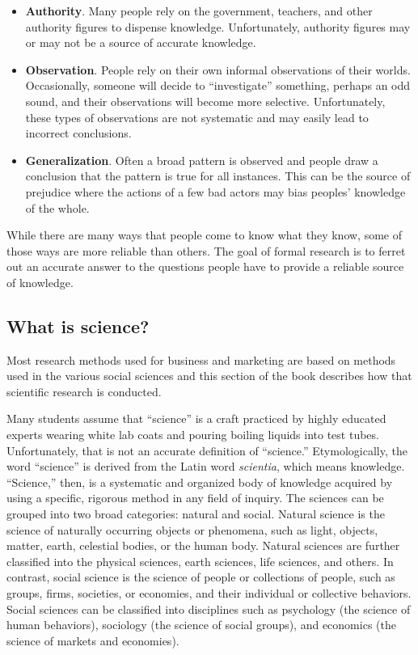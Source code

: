 \begin{itemize}
	\item \textbf{Authority}. Many people rely on the government, teachers, and other authority figures to dispense knowledge. Unfortunately, authority figures may or may not be a source of accurate knowledge.
	
	\item \textbf{Observation}. People rely on their own informal observations of their worlds. Occasionally, someone will decide to ``investigate'' something, perhaps an odd sound, and their observations will become more selective. Unfortunately, these types of observations are not systematic and may easily lead to incorrect conclusions.
	
	\item \textbf{Generalization}. Often a broad pattern is observed and people draw a conclusion that the pattern is true for all instances. This can be the source of prejudice where the actions of a few bad actors may bias peoples' knowledge of the whole.
	
\end{itemize} 

While there are many ways that people come to know what they know, some of those ways are more reliable than others. The goal of formal research is to ferret out an accurate answer to the questions people have \textemdash \; to provide a reliable source of knowledge. 

\subsection{What is science?}

Most research methods used for business and marketing are based on methods used in the various social sciences and this section of the book describes how that scientific research is conducted.

Many students assume that ``science'' is a craft practiced by highly educated experts wearing white lab coats and pouring boiling liquids into test tubes. Unfortunately, that is not an accurate definition of ``science.'' Etymologically, the word ``science'' is derived from the Latin word \textit{scientia}, which means knowledge. ``Science,'' then, is a systematic and organized body of knowledge acquired by using a specific, rigorous method in any field of inquiry. The sciences can be grouped into two broad categories: natural and social. Natural science is the science of naturally occurring objects or phenomena, such as light, objects, matter, earth, celestial bodies, or the human body. Natural sciences are further classified into the physical sciences, earth sciences, life sciences, and others. In contrast, social science is the science of people or collections of people, such as groups, firms, societies, or economies, and their individual or collective behaviors. Social sciences can be classified into disciplines such as psychology (the science of human behaviors), sociology (the science of social groups), and economics (the science of markets and economies).

